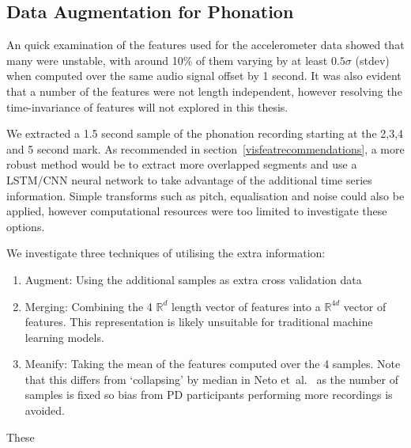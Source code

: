 \documentclass[12pt, twoside]{book}
\begin{document}
\subsection{Data Augmentation for Phonation}
An quick examination of the features used for the accelerometer data showed that many were unstable, with around 10\% of them varying by at least $0.5\sigma$ (stdev) when computed over the same audio signal offset by 1 second. It was also evident that a number of the features were not length independent, however resolving the time-invariance of features will not explored in this thesis.

We extracted a 1.5 second sample of the phonation recording starting at the 2,3,4 and 5 second mark. As recommended in section~\ref{visfeatrecommendations}, a more robust method would be to extract more overlapped segments and use a LSTM/CNN neural network to take advantage of the additional time series information. Simple transforms such as pitch, equalisation and noise could also be applied, however computational resources were too limited to investigate these options. 


We investigate three techniques of utilising the extra information:
\begin{enumerate}
	\item Augment: Using the additional samples as extra cross validation data
	\item Merging: Combining the 4 $\mathbb{R}^d$ length vector of features into a $\mathbb{R}^{4d}$ vector of features. This representation is likely unsuitable for traditional machine learning models.
	\item Meanify: Taking the mean of the features computed over the 4 samples. Note that this differs from `collapsing' by median in Neto et~al.~\cite{mpowerneto2017analysis} as the number of samples is fixed so bias from PD participants performing more recordings is avoided. 
\end{enumerate}

These 
\end{document}
